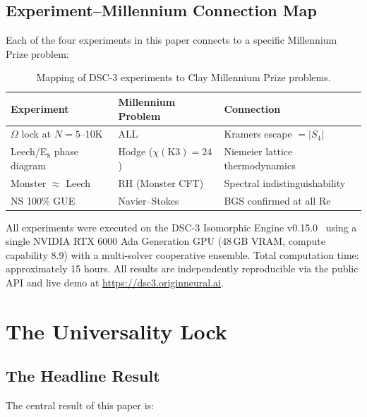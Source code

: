 \documentclass[11pt,a4paper]{article}
\begin{document}
\subsection{Experiment--Millennium Connection Map}

Each of the four experiments in this paper connects to a specific Millennium Prize problem:

\begin{table}[H]
\centering
\caption{Mapping of DSC-3 experiments to Clay Millennium Prize problems.}
\label{tab:connection_map}
\begin{tabular}{p{3.8cm}p{3.2cm}p{6.5cm}}
\toprule
\textbf{Experiment} & \textbf{Millennium Problem} & \textbf{Connection} \\
\midrule
$\Omega$ lock at $N = 5$--$10$K & ALL & Kramers escape $= |S_4|$ \\
Leech/E$_8$ phase diagram & Hodge ($\chi(\mathrm{K3}) = 24$) & Niemeier lattice thermodynamics \\
Monster $\approx$ Leech & RH (Monster CFT) & Spectral indistinguishability \\
NS 100\% GUE & Navier--Stokes & BGS confirmed at all Re \\
\bottomrule
\end{tabular}
\end{table}

\noindent All experiments were executed on the DSC-3 Isomorphic Engine v0.15.0~\cite{dsc3_benchmark} using a single NVIDIA RTX 6000 Ada Generation GPU (48\,GB VRAM, compute capability 8.9) with a multi-solver cooperative ensemble. Total computation time: approximately 15 hours. All results are independently reproducible via the public API and live demo at \url{https://dsc3.originneural.ai}.


\section{The Universality Lock}\label{sec:lock}

\subsection{The Headline Result}

The central result of this paper is:
\end{document}
